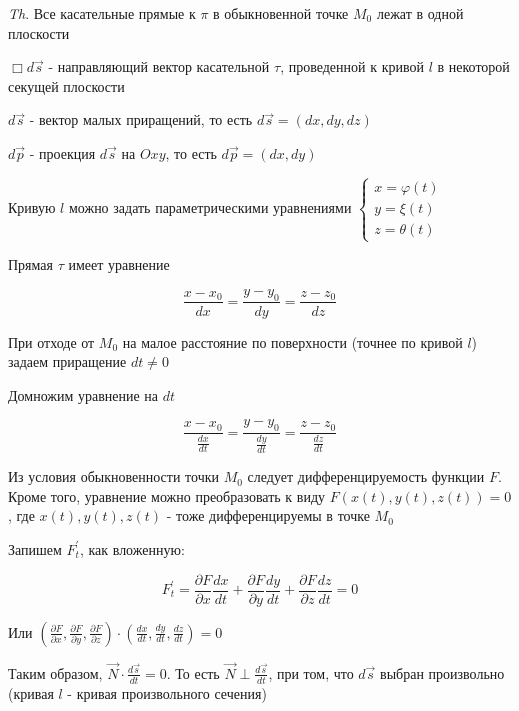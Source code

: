 \documentclass[12pt]{article}
\begin{document}
    \vspace{3mm}
\textit{Th}. Все касательные прямые к $\pi$ в обыкновенной точке $M_0$ лежат в одной плоскости

    $\Box d \overrightarrow{s}$ - направляющий вектор касательной $\tau$, проведенной к кривой $l$ в некоторой секущей плоскости

    $d \overrightarrow{s}$ - вектор малых приращений, то есть $d \overrightarrow{s} = (dx, dy, dz)$

    $d \overrightarrow{p}$ - проекция $d \overrightarrow{s}$ на $Oxy$, то есть $d \overrightarrow{p} = (dx, dy)$

    Кривую $l$ можно задать параметрическими уравнениями $\begin{cases}x = \varphi(t) \\ y = \xi(t) \\ z = \theta(t)\end{cases}$

    Прямая $\tau$ имеет уравнение

    \[\frac{x - x_0}{dx} = \frac{y - y_0}{dy} = \frac{z - z_0}{dz}\]

    При отходе от $M_0$ на малое расстояние по поверхности (точнее по кривой $l$) задаем приращение $dt \neq 0$

    Домножим уравнение на $dt$

    \[\frac{x - x_0}{\frac{dx}{dt}} = \frac{y - y_0}{\frac{dy}{dt}} = \frac{z - z_0}{\frac{dz}{dt}}\]

    Из условия обыкновенности точки $M_0$ следует дифференцируемость функции $F$.
    Кроме того, уравнение можно преобразовать к виду $F(x(t), y(t), z(t)) = 0$, где $x(t), y(t), z(t)$ - тоже дифференцируемы в точке $M_0$

    Запишем $F^\prime_t$, как вложенную:

    \[F^\prime_t = \frac{\partial F}{\partial x}\frac{dx}{dt} + \frac{\partial F}{\partial y}\frac{dy}{dt} + \frac{\partial F}{\partial z}\frac{dz}{dt} = 0\]

    Или $\displaystyle (\frac{\partial F}{\partial x}, \frac{\partial F}{\partial y}, \frac{\partial F}{\partial z}) \cdot (\frac{dx}{dt}, \frac{dy}{dt}, \frac{dz}{dt}) = 0$

    Таким образом, $\displaystyle \overrightarrow{N} \cdot \frac{d\overrightarrow{s}}{dt} = 0$. То есть $\displaystyle \overrightarrow{N} \perp \frac{d\overrightarrow{s}}{dt}$, при том, что $d\overrightarrow{s}$ выбран произвольно (кривая $l$ - кривая произвольного сечения)
\end{document}
